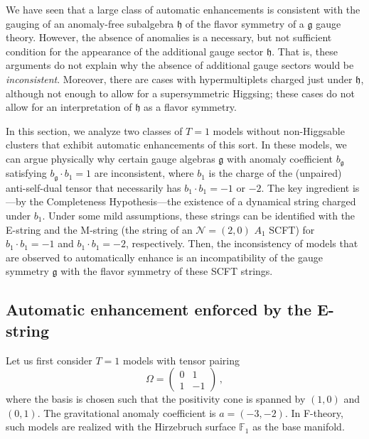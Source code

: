 \documentclass[11pt, a4paper]{article}
\newcommand*{\bbF}{\ensuremath{\mathbb{F}}}
\newcommand*{\cN}{\ensuremath{\mathcal{N}}}
\newcommand*{\fkg}{\ensuremath{\mathfrak{g}}}
\newcommand*{\fkh}{\ensuremath{\mathfrak{h}}}
\begin{document}
We have seen that a large class of automatic enhancements is consistent with the gauging of an anomaly-free subalgebra $\fkh$ of the flavor symmetry of a $\fkg$ gauge theory.
However, the absence of anomalies is a necessary, but not sufficient condition for the appearance of the additional gauge sector $\fkh$.
That is, these arguments do not explain why the absence of additional gauge sectors would be \emph{inconsistent}.
Moreover, there are cases with hypermultiplets charged just under $\fkh$, although not enough to allow for a supersymmetric Higgsing; these cases do not allow for an interpretation of $\fkh$ as a flavor symmetry.

In this section, we analyze two classes of $T=1$ models without non-Higgsable clusters that exhibit automatic enhancements of this sort.
In these models, we can argue physically why certain gauge algebras $\fkg$ with anomaly coefficient $b_\fkg$ satisfying $b_\fkg \cdot b_1 = 1$ are inconsistent, where $b_1$ is the charge of the (unpaired) anti-self-dual tensor that necessarily has $b_1 \cdot b_1 = -1$ or $-2$.
The key ingredient is---by the Completeness Hypothesis---the existence of a dynamical string charged under $b_1$.
Under some mild assumptions, these strings can be identified with the E-string and the M-string (the string of an $\cN = (2, 0)$ $A_1$ SCFT) for $b_1 \cdot b_1 = -1$ and $b_1 \cdot b_1 = -2$, respectively.
Then, the inconsistency of models that are observed to automatically enhance is an incompatibility of the gauge symmetry $\fkg$ with the flavor symmetry of these SCFT strings.

\subsection{Automatic enhancement enforced by the E-string}\label{sec:e-string}

Let us first consider $T=1$ models with tensor pairing
\begin{equation}\label{eq:tensor_charge_lattice_F1}
    \Omega = \begin{pmatrix}
        0 & 1 \\
        1 & -1
    \end{pmatrix} \, ,
\end{equation}
where the basis is chosen such that the positivity cone is spanned by $(1,0)$ and $(0,1)$.
The gravitational anomaly coefficient is $a = (-3,-2)$.
In F-theory, such models are realized with the Hirzebruch surface $\bbF_1$ as the base manifold.
\end{document}
